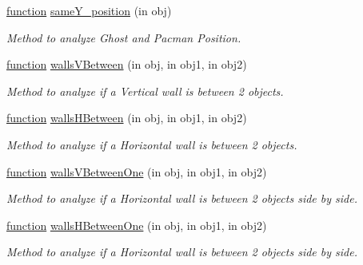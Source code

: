 \begin{DoxyCompactItemize}
\hyperlink{_plan__desuma_functions__2_players_8m_ac2ffb26d6f42d3bbcd7847b0873403f4}{function} \hyperlink{class_model_laby_a104c64766fa031eb4a29214f07da63d2}{same\+Y\+\_\+position} (in obj)
\begin{DoxyCompactList}\small\item\em Method to analyze Ghost and Pacman Position. \end{DoxyCompactList}\item 
\hyperlink{_plan__desuma_functions__2_players_8m_ac2ffb26d6f42d3bbcd7847b0873403f4}{function} \hyperlink{class_model_laby_adf2ec45a05676923165cb7f273900569}{walls\+V\+Between} (in obj, in obj1, in obj2)
\begin{DoxyCompactList}\small\item\em Method to analyze if a Vertical wall is between 2 objects. \end{DoxyCompactList}\item 
\hyperlink{_plan__desuma_functions__2_players_8m_ac2ffb26d6f42d3bbcd7847b0873403f4}{function} \hyperlink{class_model_laby_a488955f2ead0854b15302161753a0a66}{walls\+H\+Between} (in obj, in obj1, in obj2)
\begin{DoxyCompactList}\small\item\em Method to analyze if a Horizontal wall is between 2 objects. \end{DoxyCompactList}\item 
\hyperlink{_plan__desuma_functions__2_players_8m_ac2ffb26d6f42d3bbcd7847b0873403f4}{function} \hyperlink{class_model_laby_ab8486279acbf0a66424a84fa210d1b71}{walls\+V\+Between\+One} (in obj, in obj1, in obj2)
\begin{DoxyCompactList}\small\item\em Method to analyze if a Horizontal wall is between 2 objects side by side. \end{DoxyCompactList}\item 
\hyperlink{_plan__desuma_functions__2_players_8m_ac2ffb26d6f42d3bbcd7847b0873403f4}{function} \hyperlink{class_model_laby_a450d4d89542d177b6676375984146f4c}{walls\+H\+Between\+One} (in obj, in obj1, in obj2)
\begin{DoxyCompactList}\small\item\em Method to analyze if a Horizontal wall is between 2 objects side by side. \end{DoxyCompactList}\end{DoxyCompactItemize}
